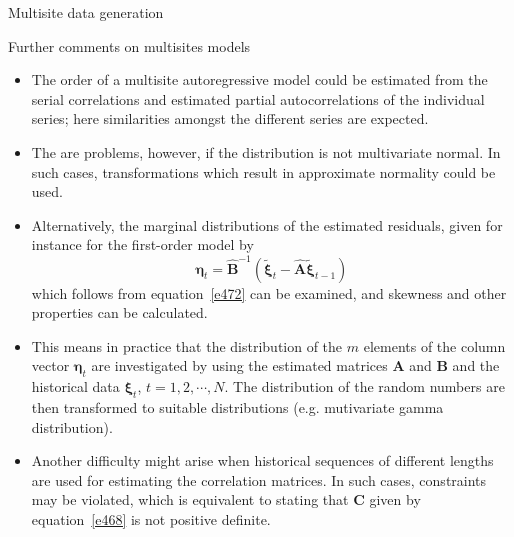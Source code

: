 \documentclass[8pt]{beamer}
\renewcommand{\emph}[1]{\textcolor{myorange}{#1}}
\newcommand{\ve}[1]{\boldsymbol{#1}}
\begin{document}
\begin{frame}{Multisite data generation}
    \begin{block}{Further comments on multisites models}
    \end{block}
    \begin{itemize}
        \item The order of a \emph{multisite autoregressive model} could be estimated from the \emph{serial correlations} and estimated \emph{partial autocorrelations} of the individual series; here similarities amongst the different series are expected. 
        \item The are problems, however, if the distribution is not \emph{multivariate normal}. In such cases, \emph{transformations} which result in approximate normality could be used. 
        \item Alternatively, the \emph{marginal distributions} of the estimated \emph{residuals}, given for instance for the \emph{first-order model} by
\begin{equation}
    \ve{\eta}_t = \hat{\mathbf{B}}^{-1} \left(\tilde{\ve{\xi}}_t - \hat{\mathbf{A}} \tilde{\ve{\xi}}_{t-1} \right)
        \label{e477}
    \end{equation}
    which follows from equation~\ref{e472} can be examined, and skewness and other properties can be calculated. 
\item This means in practice that the distribution of the $m$ elements of the column vector $\ve{\eta}_t$ are investigated by using the estimated matrices $\mathbf{A}$ and $\mathbf{B}$ and the historical data $\ve{\xi}_t$, $t=1,2,\cdots,N$. The distribution of the \emph{random numbers} are then transformed to suitable distributions (e.g. mutivariate gamma distribution).
\item Another difficulty might arise when historical sequences of different lengths are used for estimating the \emph{correlation matrices}. In such cases, constraints may be violated, which is equivalent to stating that $\mathbf{C}$ given by equation~\ref{e468} is not positive definite.
    \end{itemize}
\end{frame}

\end{document}
